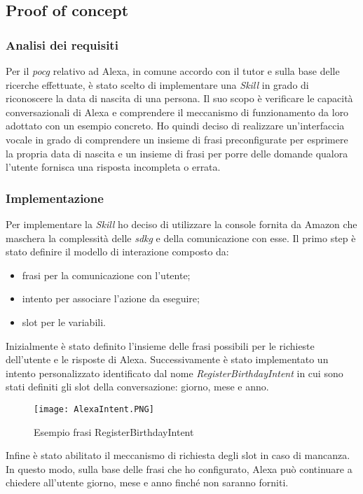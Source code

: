 	\subsection{Proof of concept}
		\subsubsection{Analisi dei requisiti}
		Per il \emph{\gls{pocg}} relativo ad Alexa, in comune accordo con il tutor e sulla base delle ricerche effettuate, è stato scelto di implementare una \emph{Skill} in grado di riconoscere la data di nascita di una persona. Il suo scopo è verificare le capacità conversazionali di Alexa e comprendere il meccanismo di funzionamento da loro adottato con un esempio concreto.
		Ho quindi deciso di realizzare un'interfaccia vocale in grado di comprendere un insieme di frasi preconfigurate per esprimere la propria data di nascita e un insieme di frasi per porre delle domande qualora l'utente fornisca una risposta incompleta o errata.
		\subsubsection{Implementazione}
		Per implementare la \emph{Skill} ho deciso di utilizzare la console fornita da Amazon che maschera la complessità delle \emph{\gls{sdkg}} e della comunicazione con esse. Il primo step è stato definire il modello di interazione composto da:
		\begin{itemize}
			\item frasi per la comunicazione con l'utente;
			\item intento per associare l'azione da eseguire;
			\item slot per le variabili.
		\end{itemize}
		Inizialmente è stato definito l'insieme delle frasi possibili per le richieste dell'utente e le risposte di Alexa. Successivamente è stato implementato un intento personalizzato identificato dal nome \emph{RegisterBirthdayIntent} in cui sono stati definiti gli slot della conversazione: giorno, mese e anno.
		
		\begin{figure}[htbp]
			\begin{center}
				\texttt{[image: AlexaIntent.PNG]}
				\caption{Esempio frasi RegisterBirthdayIntent}
			\end{center}
		\end{figure}
		
		\pagebreak
		Infine è stato abilitato il meccanismo di richiesta degli slot in caso di mancanza. In questo modo, sulla base delle frasi che ho configurato, Alexa può continuare a chiedere all'utente giorno, mese e anno finché non saranno forniti.
		

